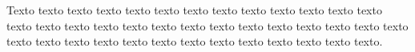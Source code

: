 \label{ap:apendice_b}

Texto texto texto texto texto texto texto texto texto texto texto texto texto texto texto texto texto texto texto texto texto texto texto texto texto texto texto texto texto texto texto texto texto texto texto texto texto texto texto texto.
